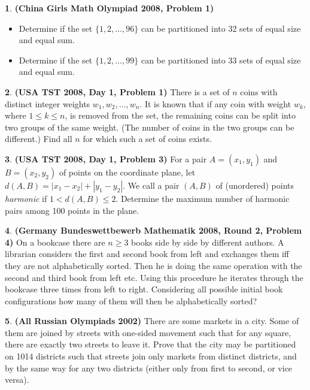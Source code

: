 \documentclass{article}
\newcommand{\plus}{+}
\newcommand{\minus}{-}
\newcommand{\equal}{=}
\theoremstyle{definition}
\newtheorem{p}{}
\begin{document}
\begin{p}{\bf (China Girls Math Olympiad 2008, Problem 1)}
\begin{itemize}
\item Determine if the set $ \{1,2,\ldots,96\}$ can be partitioned into 32 sets of equal size and equal sum.
\item Determine if the set $ \{1,2,\ldots,99\}$ can be partitioned into 33 sets of equal size and equal sum.
\end{itemize}
\end{p}



\begin{p}{\bf (USA TST 2008, Day 1, Problem 1)}
There is a set of $ n$ coins with distinct integer weights $ w_1, w_2, \ldots , w_n$. It is known that if any coin with weight $ w_k$, where $ 1 \leq k \leq n$, is removed from the set, the remaining coins can be split into two groups of the same weight. (The number of coins in the two groups can be different.) Find all $ n$ for which such a set of coins exists.
\end{p}




\begin{p}{\bf (USA TST 2008, Day 1, Problem 3)}
For a pair $ A \equal{} (x_1, y_1)$ and $ B \equal{} (x_2, y_2)$ of points on the coordinate plane, let $ d(A,B) \equal{} |x_1 \minus{} x_2| \plus{} |y_1 \minus{} y_2|$. We call a pair $ (A,B)$ of (unordered) points {\it harmonic} if $ 1 < d(A,B) \leq 2$. Determine the maximum number of harmonic pairs among 100 points in the plane.
\end{p}




\begin{p}{\bf (Germany Bundeswettbewerb Mathematik 2008, Round 2, Problem 4)}
On a bookcase there are $ n \geq 3$ books side by side by different authors. A librarian considers the first and second book from left and exchanges them iff they are not alphabetically sorted. Then he is doing the same operation with the second and third book from left etc. Using this procedure he iterates through the bookcase three times from left to right. Considering all possible initial book configurations how many of them will then be alphabetically sorted?
\end{p}



\begin{p}{\bf(All Russian Olympiads 2002)}
There are some markets in a city. Some of them are joined by streets with one-sided movement such that for any square, there are exactly two streets to leave it. Prove that the city may be partitioned on 1014 districts such that streets join only markets from distinct districts, and by the same way for any two districts (either only from first to second, or vice versa).
\end{p}
\end{document}
